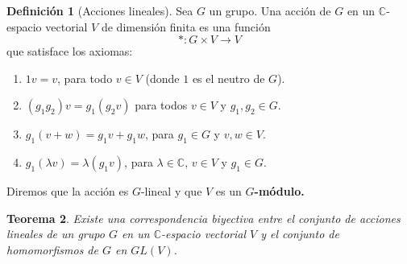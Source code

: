 \documentclass[12pt]{book}
\newtheorem{theorem}{Teorema}[section]
\theoremstyle{definition}
\newtheorem{definition}[theorem]{Definición}
\newcounter{in}
\newcounter{ini}
\begin{document}
\begin{definition}[Acciones lineales]
  \label{Gmodulo}
  Sea $G$ un grupo. Una acción de $G$ en un $\mathbb{C}$-espacio
  vectorial $V$ de dimensión finita es una función
 $$*:G\times V \rightarrow V $$
que satisface los axiomas:
\begin{enumerate}
\item $1v=v$, para todo $v\in V$ (donde $1$ es el neutro de $G$).
\item $(g_{1}g_{2})v=g_{1}(g_{2}v)$ para todos $v\in V$ y
  $g_{1},g_{2}\in G$.
\item $g_{1}(v+w)=g_{1}v+g_{1}w$, para $g_{1}\in G$ y $v,w \in V .$
\item $g_{1}(\lambda v)=\lambda(g_{1}v)$, para $\lambda \in \mathbb{C}$,
  $v\in V$ y $g_{1}\in G.$
\end{enumerate}
Diremos que la acción es $G$-lineal y que $V$ es un \textbf{$G$-módulo.}
\end{definition} 

\begin{theorem}
  \label{rep-mod}
  Existe una correspondencia biyectiva entre el conjunto de acciones
  lineales de un grupo $G$ en un $\mathbb{C}$-espacio vectorial $V$ y el conjunto
  de homomorfismos de $G$ en $GL(V)$.
\end{theorem}
\end{document}
